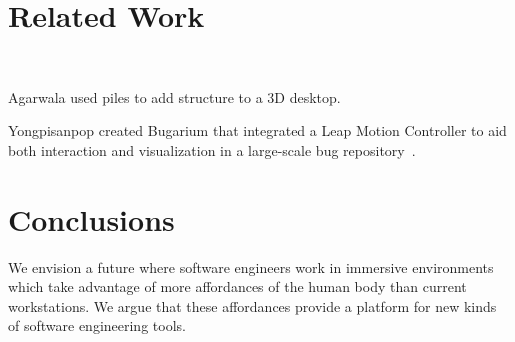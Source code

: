 \documentclass[conference]{IEEEtran}
\begin{document}


\section{Related Work}

\\



Agarwala used piles to add structure to a 3D desktop.~\cite{Agarawala:BumpTop}

Yongpisanpop created Bugarium that integrated a Leap Motion Controller to aid both interaction and visualization in a large-scale bug repository~\cite{Bugarium}.



\section{Conclusions}

We envision a future where software engineers work in immersive environments which take advantage of more affordances of the human body than current workstations.
We argue that these affordances provide a platform for new kinds of software engineering tools. 


\end{document}
